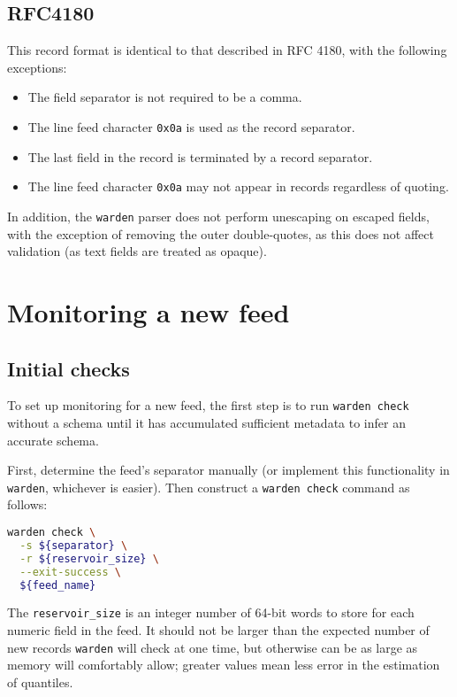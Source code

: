 \documentclass[a4paper]{article}
\begin{document}
\subsection{RFC4180}

This record format is identical to that described in RFC 4180, with
the following exceptions:

\begin{itemize}
  \item The field separator is not required to be a comma.
  \item The line feed character \texttt{0x0a} is used as the record
    separator.
  \item The last field in the record is terminated by a record separator.
  \item The line feed character \texttt{0x0a} may not appear in
    records regardless of quoting.
\end{itemize}

In addition, the \texttt{warden} parser does not perform unescaping on
escaped fields, with the exception of removing the outer
double-quotes, as this does not affect validation (as text fields are
treated as opaque).

\section{Monitoring a new feed}\label{monitoring-a-new-feed}

\subsection{Initial checks}

To set up monitoring for a new feed, the first step is to run
\texttt{warden check} without a schema until it has accumulated
sufficient metadata to infer an accurate schema.

First, determine the feed's separator manually (or implement this
functionality in \texttt{warden}, whichever is easier). Then construct
a \texttt{warden check} command as follows:

\begin{lstlisting}[language=bash]
warden check \
  -s ${separator} \
  -r ${reservoir_size} \
  --exit-success \
  ${feed_name}
\end{lstlisting}

The \texttt{reservoir\_size} is an integer number of 64-bit words to
store for each numeric field in the feed. It should not be larger than
the expected number of new records \texttt{warden} will check at one
time, but otherwise can be as large as memory will comfortably allow;
greater values mean less error in the estimation of quantiles.
\end{document}
